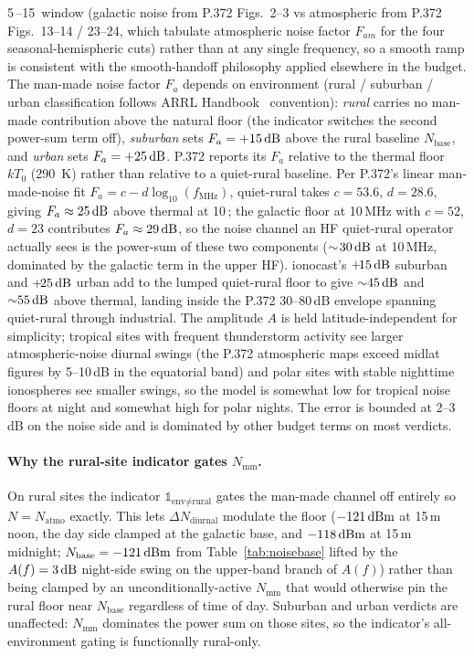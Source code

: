 \documentclass[11pt,a4paper]{article}
\newcommand{\SI}[2]{#1\,\text{#2}}
\newcommand{\si}[1]{\text{#1}}
\newcommand{\dB}{\text{dB}}
\newcommand{\dBm}{\text{dBm}}
\newcommand{\MHz}{\text{MHz}}
\begin{document}
\SI{5}{\MHz}--\SI{15}{\MHz} window (galactic noise from P.372
Figs.~2--3 vs atmospheric from P.372 Figs.~13--14 / 23--24,
which tabulate atmospheric noise factor $F_{am}$ for the four
seasonal-hemispheric cuts) rather than at any single frequency,
so a smooth ramp is consistent with the smooth-handoff philosophy
applied elsewhere in the budget.
The man-made noise factor $F_a$ depends on environment
(rural / suburban / urban classification follows ARRL
Handbook~\cite{arrl2023handbook} convention):
\emph{rural} carries no man-made contribution above the natural
floor (the indicator switches the second power-sum term off),
\emph{suburban} sets $F_a = \SI{+15}{\dB}$ above the rural baseline
$N_{\text{base}}$, and \emph{urban} sets $F_a = \SI{+25}{\dB}$.
P.372 reports its $F_a$ relative to the thermal floor $kT_0$ (290~K)
rather than relative to a quiet-rural baseline.  Per P.372's
linear man-made-noise fit $F_a = c - d\log_{10}(f_{\text{MHz}})$,
quiet-rural takes $c = 53.6$, $d = 28.6$, giving $F_a \approx
\SI{25}{\dB}$ above thermal at \SI{10}{\MHz}; the galactic
floor at 10\,MHz with $c = 52$, $d = 23$ contributes $F_a
\approx \SI{29}{\dB}$, so the noise channel an HF
quiet-rural operator actually sees is the power-sum of these
two components ($\sim\!\SI{30}{\dB}$ at 10\,MHz, dominated by
the galactic term in the upper HF).  ionocast's
$+\!\SI{15}{\dB}$ suburban and $+\!\SI{25}{\dB}$ urban add to
the lumped quiet-rural floor to give ${\sim}\SI{45}{\dB}$ and
${\sim}\SI{55}{\dB}$ above thermal, landing inside the P.372
$30$--$80$\,dB envelope spanning quiet-rural through
industrial.  The amplitude $A$ is
held latitude-independent for simplicity; tropical sites with
frequent thunderstorm activity see larger atmospheric-noise diurnal
swings (the P.372 atmospheric maps exceed midlat figures by
5--10\,dB in the equatorial band) and polar sites with stable
nighttime ionospheres see smaller swings, so the model is somewhat
low for tropical noise floors at night and somewhat high for polar
nights.  The error is bounded at 2--3\,dB on the noise side and is
dominated by other budget terms on most verdicts.

\paragraph{Why the rural-site indicator gates $N_{\text{mm}}$.}
On rural sites the indicator $\mathbb{1}_{\text{env}\ne\text{rural}}$
gates the man-made channel off entirely so $N = N_{\text{atmo}}$
exactly.  This lets $\Delta N_{\text{diurnal}}$ modulate the
floor ($-121\,\si{\dBm}$ at 15\,m noon, the day side clamped
at the galactic base, and $-118\,\si{\dBm}$
at 15\,m midnight; $N_{\text{base}} = -121\,\si{\dBm}$ from
Table~\ref{tab:noisebase} lifted by the $A(f) = \SI{3}{\dB}$
night-side swing on the upper-band branch of $A(f)$) rather than
being clamped by an
unconditionally-active $N_{\text{mm}}$ that would otherwise pin
the rural floor near $N_{\text{base}}$ regardless of time of
day.  Suburban and urban verdicts are unaffected: $N_{\text{mm}}$
dominates the power sum on those sites, so the indicator's
all-environment gating is functionally rural-only.
\end{document}

